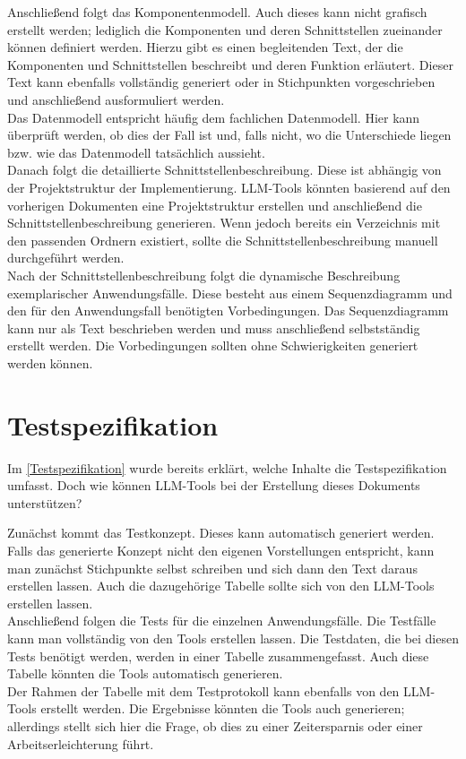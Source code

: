 Anschließend folgt das Komponentenmodell. Auch dieses kann nicht grafisch erstellt werden; lediglich die Komponenten 
und deren Schnittstellen zueinander können definiert werden. Hierzu gibt es einen begleitenden Text, der die 
Komponenten und Schnittstellen beschreibt und deren Funktion erläutert. Dieser Text kann ebenfalls vollständig 
generiert oder in Stichpunkten vorgeschrieben und anschließend ausformuliert werden.\\

Das Datenmodell entspricht häufig dem fachlichen Datenmodell. Hier kann überprüft werden, ob dies der Fall ist und, 
falls nicht, wo die Unterschiede liegen bzw. wie das Datenmodell tatsächlich aussieht.\\

Danach folgt die detaillierte Schnittstellenbeschreibung. Diese ist abhängig von der Projektstruktur der 
Implementierung. LLM-Tools könnten basierend auf den vorherigen Dokumenten eine Projektstruktur erstellen und 
anschließend die Schnittstellenbeschreibung generieren. Wenn jedoch bereits ein Verzeichnis mit den passenden 
Ordnern existiert, sollte die Schnittstellenbeschreibung manuell durchgeführt werden.\\

Nach der Schnittstellenbeschreibung folgt die dynamische Beschreibung exemplarischer Anwendungsfälle. Diese besteht 
aus einem Sequenzdiagramm und den für den Anwendungsfall benötigten Vorbedingungen. Das Sequenzdiagramm kann nur als 
Text beschrieben werden und muss anschließend selbstständig erstellt werden. Die Vorbedingungen sollten ohne 
Schwierigkeiten generiert werden können.

\section{Testspezifikation}  \label{LLMTestspezifikation}

Im \autoref{Testspezifikation} wurde bereits erklärt, welche Inhalte die Testspezifikation umfasst. Doch wie können 
LLM-Tools bei der Erstellung dieses Dokuments unterstützen?

Zunächst kommt das Testkonzept. Dieses kann automatisch generiert werden. Falls das generierte Konzept nicht den 
eigenen Vorstellungen entspricht, kann man zunächst Stichpunkte selbst schreiben und sich dann den Text daraus 
erstellen lassen. Auch die dazugehörige Tabelle sollte sich von den LLM-Tools erstellen lassen.\\

Anschließend folgen die Tests für die einzelnen Anwendungsfälle. Die Testfälle kann man vollständig von den Tools 
erstellen lassen. Die Testdaten, die bei diesen Tests benötigt werden, werden in einer Tabelle zusammengefasst. 
Auch diese Tabelle könnten die Tools automatisch generieren.\\

Der Rahmen der Tabelle mit dem Testprotokoll kann ebenfalls von den LLM-Tools erstellt werden. Die Ergebnisse 
könnten die Tools auch generieren; allerdings stellt sich hier die Frage, ob dies zu einer Zeitersparnis oder 
einer Arbeitserleichterung führt.\\